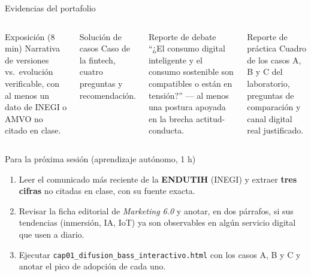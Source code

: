 \documentclass[aspectratio=169,xcolor=dvipsnames]{beamer}
\begin{document}
\begin{frame}{Evidencias del portafolio}
\small
\begin{columns}[T]
  \begin{block}{Exposición (8 min)}
    \scriptsize Narrativa de versiones vs.\ evolución verificable, con al menos un dato de INEGI o AMVO no citado en clase.
  \end{block}
  \begin{block}{Solución de casos}
    \scriptsize Caso de la fintech, cuatro preguntas y recomendación.
  \end{block}
  \begin{block}{Reporte de debate}
    \scriptsize \enquote{¿El consumo digital inteligente y el consumo sostenible son compatibles o están en tensión?} — al menos una postura apoyada en la brecha actitud-conducta.
  \end{block}
  \begin{block}{Reporte de práctica}
    \scriptsize Cuadro de los casos A, B y C del laboratorio, preguntas de comparación y canal digital real justificado.
  \end{block}
\end{columns}
\end{frame}

\begin{frame}{Para la próxima sesión (aprendizaje autónomo, 1 h)}
\begin{enumerate}
  \item Leer el comunicado más reciente de la \textbf{ENDUTIH} (INEGI) y extraer \textbf{tres cifras} no citadas en clase, con su fuente exacta.
  \vspace{4pt}
  \item Revisar la ficha editorial de \textit{Marketing 6.0} y anotar, en dos párrafos, si sus tendencias (inmersión, IA, IoT) ya son observables en algún servicio digital que usen a diario.
  \vspace{4pt}
  \item Ejecutar \texttt{cap01\_difusion\_bass\_\allowbreak interactivo.html} con los casos A, B y C y anotar el pico de adopción de cada uno.
\end{enumerate}
\end{frame}
\end{document}
